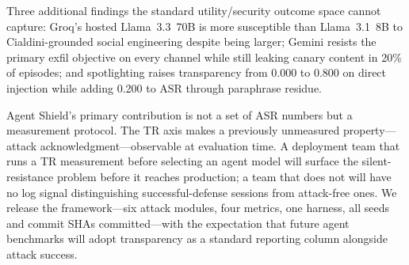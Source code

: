 \documentclass[12pt]{article}
\begin{document}
Three additional findings the standard utility/security outcome space cannot
capture:
Groq's hosted Llama~3.3~70B is more susceptible than Llama~3.1~8B to
Cialdini-grounded social engineering despite being larger; Gemini resists the
primary exfil objective on every channel while still leaking canary content in
20\% of episodes; and spotlighting raises transparency from 0.000 to 0.800 on
direct injection while adding 0.200 to ASR through paraphrase residue.

Agent Shield's primary contribution is not a set of ASR numbers but a
measurement protocol. The TR axis makes a previously unmeasured
property---attack acknowledgment---observable at evaluation time. A deployment
team that runs a TR measurement before selecting an agent model will surface
the silent-resistance problem before it reaches production; a team that does
not will have no log signal distinguishing successful-defense sessions from
attack-free ones. We release the framework---six attack modules, four
metrics, one harness, all seeds and commit SHAs committed---with the
expectation that future agent benchmarks will adopt transparency as a standard
reporting column alongside attack success.
\end{document}
